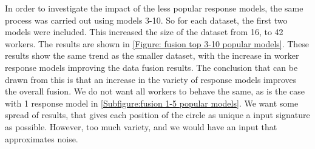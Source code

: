 In order to investigate the impact of the less popular response models, the same process was carried out using models 3-10. So for each dataset, the first two models were included. This increased the size of the dataset from 16, to 42 workers. The results are shown in \ref{Figure: fusion top 3-10 popular models}. These results show the same trend as the smaller dataset, with the increase in worker response models improving the data fusion results. The conclusion that can be drawn from this is that an increase in the variety of response models improves the overall fusion. We do not want all workers to behave the same, as is the case with 1 response model in \ref{Subfigure:fusion 1-5 popular models}. We want some spread of results, that gives each position of the circle as unique a input signature as possible. However, too much variety, and we would have an input that approximates noise.


















